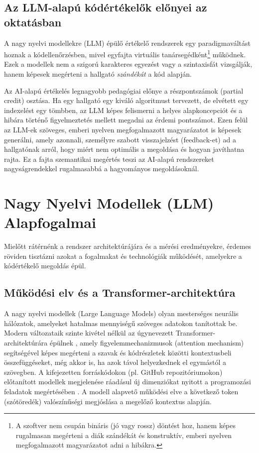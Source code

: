 \documentclass[12pt,a4paper]{article}
\begin{document}
\subsection{Az LLM-alapú kódértékelők előnyei az oktatásban}
A nagy nyelvi modellekre (LLM) épülő értékelő rendszerek egy paradigmaváltást hoznak a kódellenőrzésben, mivel egyfajta virtuális tanársegédként\footnote{A szoftver nem csupán bináris (jó vagy rossz) döntést hoz, hanem képes rugalmasan megérteni a diák szándékát és konstruktív, emberi nyelven megfogalmazott magyarázatot adni a hibákra.} működnek. Ezek a modellek nem a szigorú karakteres egyezést vagy a szintaxisfát vizsgálják, hanem képesek megérteni a hallgató \textit{szándékát} a kód alapján.

Az AI-alapú értékelés legnagyobb pedagógiai előnye a részpontszámok (partial credit) osztása. Ha egy hallgató egy kiváló algoritmust tervezett, de elvétett egy indexelést egy tömbben, az LLM képes felismerni a helyes alapkoncepciót és a hibára történő figyelmeztetés mellett megadni az érdemi pontszámot. Ezen felül az LLM-ek szöveges, emberi nyelven megfogalmazott magyarázatot is képesek generálni, amely azonnali, személyre szabott visszajelzést (feedback-et) ad a hallgatónak arról, hogy miért nem optimális a megoldása és hogyan javíthatna rajta. Ez a fajta szemantikai megértés teszi az AI-alapú rendszereket nagyságrendekkel rugalmasabbá a hagyományos megoldásoknál.

\section{Nagy Nyelvi Modellek (LLM) Alapfogalmai}
\label{sec:llm_alapok}
Mielőtt rátérnénk a rendszer architektúrájára és a mérési eredményekre, érdemes röviden tisztázni azokat a fogalmakat és technológiák működését, amelyekre a kódértékelő megoldás épül.

\subsection{Működési elv és a Transformer-architektúra}
A nagy nyelvi modellek (Large Language Models) olyan mesterséges neurális hálózatok, amelyeket hatalmas mennyiségű szöveges adatokon tanítottak be. Modern változataik szinte kivétel nélkül az úgynevezett Transformer-architektúrára épülnek \cite{vaswani2017attention}, amely figyelemmechanizmusok (attention mechanism) segítségével képes megérteni a szavak és kódrészletek közötti kontextusbeli összefüggéseket, még akkor is, ha azok távol helyezkednek el egymástól a szövegben. A kifejezetten forráskódokon (pl. GitHub repozitóriumokon) előtanított modellek megjelenése ráadásul új dimenziókat nyitott a programozási feladatok megértésében \cite{chen2021codex}. A modell alapvető működési elve a következő token (szótöredék) valószínűségi megjóslása a megelőző kontextus alapján.
\end{document}
